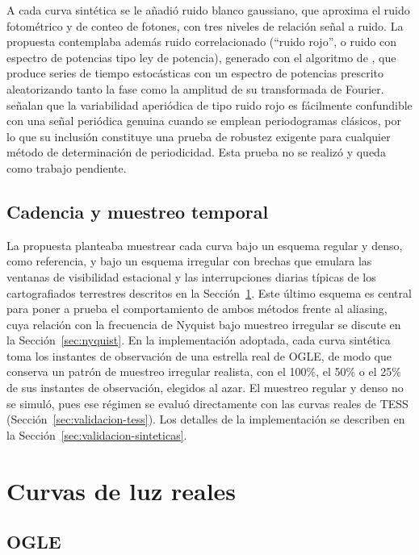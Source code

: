 \documentclass[12pt,letterpaper,oneside]{book}
\begin{document}
A cada curva sint\'etica se le a\~nadi\'o ruido blanco gaussiano, que aproxima el ruido fotom\'etrico y de conteo de fotones, con tres niveles de relaci\'on se\~nal a ruido. La propuesta contemplaba adem\'as ruido correlacionado (``ruido rojo'', o ruido con espectro de potencias tipo ley de potencia), generado con el algoritmo de \citet{timmer_1995}, que produce series de tiempo estoc\'asticas con un espectro de potencias prescrito aleatorizando tanto la fase como la amplitud de su transformada de Fourier. \citet{gurpide_2025} se\~nalan que la variabilidad aperi\'odica de tipo ruido rojo es f\'acilmente confundible con una se\~nal peri\'odica genuina cuando se emplean periodogramas cl\'asicos, por lo que su inclusi\'on constituye una prueba de robustez exigente para cualquier m\'etodo de determinaci\'on de periodicidad. Esta prueba no se realiz\'o y queda como trabajo pendiente.

\subsection{Cadencia y muestreo temporal}

La propuesta planteaba muestrear cada curva bajo un esquema regular y denso, como referencia, y bajo un esquema irregular con brechas que emulara las ventanas de visibilidad estacional y las interrupciones diarias t\'ipicas de los cartografiados terrestres descritos en la Secci\'on~\ref{sec:datos-reales}. Este \'ultimo esquema es central para poner a prueba el comportamiento de ambos m\'etodos frente al aliasing, cuya relaci\'on con la frecuencia de Nyquist bajo muestreo irregular se discute en la Secci\'on~\ref{sec:nyquist}. En la implementaci\'on adoptada, cada curva sint\'etica toma los instantes de observaci\'on de una estrella real de OGLE, de modo que conserva un patr\'on de muestreo irregular realista, con el 100\%, el 50\% o el 25\% de sus instantes de observaci\'on, elegidos al azar. El muestreo regular y denso no se simul\'o, pues ese r\'egimen se evalu\'o directamente con las curvas reales de TESS (Secci\'on~\ref{sec:validacion-tess}). Los detalles de la implementaci\'on se describen en la Secci\'on~\ref{sec:validacion-sinteticas}.

\section{Curvas de luz reales}
\label{sec:datos-reales}

\subsection{OGLE}
\end{document}
